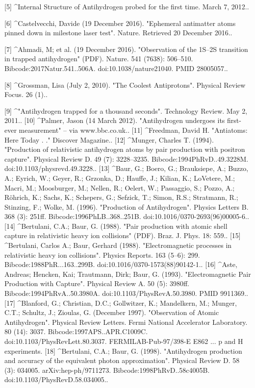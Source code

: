 [5]
^Internal Structure of Antihydrogen probed for the first time. March 7, 2012..

[6]
^Castelvecchi, Davide (19 December 2016). "Ephemeral antimatter atoms pinned down in milestone laser test". Nature. Retrieved 20 December 2016..

[7]
^Ahmadi, M; et al. (19 December 2016). "Observation of the 1S–2S transition in trapped antihydrogen" (PDF). Nature. 541 (7638): 506–510. Bibcode:2017Natur.541..506A. doi:10.1038/nature21040. PMID 28005057..

[8]
^Grossman, Lisa (July 2, 2010). "The Coolest Antiprotons". Physical Review Focus. 26 (1)..

[9]
^"Antihydrogen trapped for a thousand seconds". Technology Review. May 2, 2011..
[10]
^Palmer, Jason (14 March 2012). "Antihydrogen undergoes its first-ever measurement" – via www.bbc.co.uk..
[11]
^Freedman, David H. "Antiatoms: Here Today . ." Discover Magazine..
[12]
^Munger, Charles T. (1994). "Production of relativistic antihydrogen atoms by pair production with positron capture". Physical Review D. 49 (7): 3228–3235. Bibcode:1994PhRvD..49.3228M. doi:10.1103/physrevd.49.3228..
[13]
^Baur, G.; Boero, G.; Brauksiepe, A.; Buzzo, A.; Eyrich, W.; Geyer, R.; Grzonka, D.; Hauffe, J.; Kilian, K.; LoVetere, M.; Macri, M.; Moosburger, M.; Nellen, R.; Oelert, W.; Passaggio, S.; Pozzo, A.; Röhrich, K.; Sachs, K.; Schepers, G.; Sefzick, T.; Simon, R.S.; Stratmann, R.; Stinzing, F.; Wolke, M. (1996). "Production of Antihydrogen". Physics Letters B. 368 (3): 251ff. Bibcode:1996PhLB..368..251B. doi:10.1016/0370-2693(96)00005-6..
[14]
^Bertulani, C.A.; Baur, G. (1988). "Pair production with atomic shell capture in relativistic heavy ion collisions" (PDF). Braz. J. Phys. 18: 559..
[15]
^Bertulani, Carlos A.; Baur, Gerhard (1988). "Electromagnetic processes in relativistic heavy ion collisions". Physics Reports. 163 (5–6): 299. Bibcode:1988PhR...163..299B. doi:10.1016/0370-1573(88)90142-1..
[16]
^Aste, Andreas; Hencken, Kai; Trautmann, Dirk; Baur, G. (1993). "Electromagnetic Pair Production with Capture". Physical Review A. 50 (5): 3980ff. Bibcode:1994PhRvA..50.3980A. doi:10.1103/PhysRevA.50.3980. PMID 9911369..
[17]
^Blanford, G.; Christian, D.C.; Gollwitzer, K.; Mandelkern, M.; Munger, C.T.; Schultz, J.; Zioulas, G. (December 1997). "Observation of Atomic Antihydrogen". Physical Review Letters. Fermi National Accelerator Laboratory. 80 (14): 3037. Bibcode:1997APS..APR.C1009C. doi:10.1103/PhysRevLett.80.3037. FERMILAB-Pub-97/398-E E862 ... p and H experiments.
[18]
^Bertulani, C.A.; Baur, G. (1998). "Antihydrogen production and accuracy of the equivalent photon approximation". Physical Review D. 58 (3): 034005. arXiv:hep-ph/9711273. Bibcode:1998PhRvD..58c4005B. doi:10.1103/PhysRevD.58.034005..
